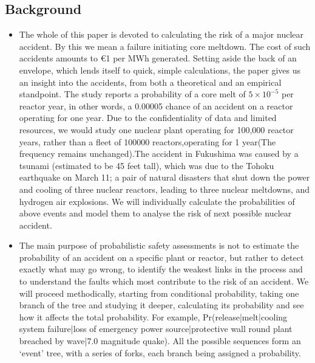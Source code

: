\documentclass{article}
\begin{document}
\subsection{Background}
\begin{itemize}
\item
  The whole of this paper is devoted to calculating the risk of a major nuclear accident.  By this we mean a failure initiating core meltdown. The cost of such accidents amounts to €1 per MWh generated. Setting aside the back of an envelope, which lends itself to quick, simple calculations, the paper gives us an insight into the accidents, from both a theoretical and an empirical standpoint. The study reports a probability of a core melt of $5\times10^{-5}$ per reactor year, in other words, a 0.00005 chance of an accident on a reactor operating for one year. Due to the confidentiality of data and limited resources, we would study one nuclear plant operating for 100,000 reactor years, rather than a fleet of 100000 reactors,operating for 1 year(The frequency remains unchanged)\cite{cite1}.The accident in Fukushima was caused by a tsunami (estimated to be 45 feet tall), which was due to the Tohoku earthquake on March 11; a pair of natural disasters that shut down the power and cooling of three nuclear reactors, leading to three nuclear meltdowns, and hydrogen air explosions. We will individually calculate the probabilities of above events and model them to analyse the risk of next possible nuclear accident.


\item
  The main purpose of probabilistic safety assessments is not to estimate the probability of an accident on a specific plant or reactor, but rather to detect exactly what may go wrong, to identify the weakest links in the process and to understand the faults which most contribute to the risk of an accident. We will proceed methodically, starting from conditional probability, taking one branch of the tree and studying it deeper, calculating its probability and see how it affects the total probability. For example, Pr(release|melt|cooling system failure|loss of emergency power source|protective wall round plant breached by wave|7.0 magnitude quake)\cite{cite1}. All the possible sequences form an ‘event’ tree, with a series of forks, each branch being assigned a probability.


\end{itemize}
\end{document}
